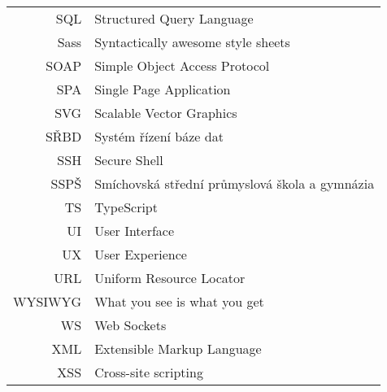 \begin{longtable}{rl}
SQL & Structured Query Language\\
Sass & Syntactically awesome style sheets\\
SOAP & Simple Object Access Protocol\\
SPA & Single Page Application\\
SVG & Scalable Vector Graphics\\
SŘBD & Systém řízení báze dat\\
SSH & Secure Shell\\
SSPŠ & Smíchovská střední průmyslová škola a gymnázia\\
TS & TypeScript\\
UI & User Interface\\
UX & User Experience\\
URL & Uniform Resource Locator\\
WYSIWYG & What you see is what you get\\
WS & Web Sockets\\
XML & Extensible Markup Language\\
XSS & Cross-site scripting
\end{longtable}